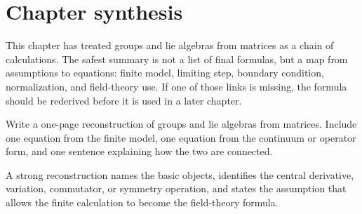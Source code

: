 \section{Chapter synthesis}

This chapter has treated groups and lie algebras from matrices as a chain of calculations.  The safest summary is not a list of final formulas, but a map from assumptions to equations: finite model, limiting step, boundary condition, normalization, and field-theory use.  If one of those links is missing, the formula should be rederived before it is used in a later chapter.

\begin{exercise}
Write a one-page reconstruction of groups and lie algebras from matrices.  Include one equation from the finite model, one equation from the continuum or operator form, and one sentence explaining how the two are connected.
\begin{answer}
A strong reconstruction names the basic objects, identifies the central derivative, variation, commutator, or symmetry operation, and states the assumption that allows the finite calculation to become the field-theory formula.
\end{answer}
\end{exercise}
